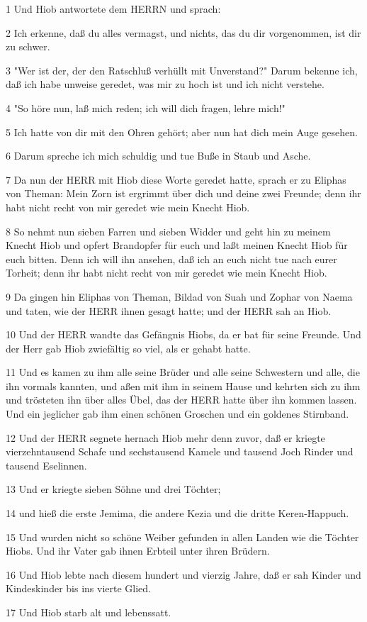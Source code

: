 \par 1 Und Hiob antwortete dem HERRN und sprach:
\par 2 Ich erkenne, daß du alles vermagst, und nichts, das du dir vorgenommen, ist dir zu schwer.
\par 3 "Wer ist der, der den Ratschluß verhüllt mit Unverstand?" Darum bekenne ich, daß ich habe unweise geredet, was mir zu hoch ist und ich nicht verstehe.
\par 4 "So höre nun, laß mich reden; ich will dich fragen, lehre mich!"
\par 5 Ich hatte von dir mit den Ohren gehört; aber nun hat dich mein Auge gesehen.
\par 6 Darum spreche ich mich schuldig und tue Buße in Staub und Asche.
\par 7 Da nun der HERR mit Hiob diese Worte geredet hatte, sprach er zu Eliphas von Theman: Mein Zorn ist ergrimmt über dich und deine zwei Freunde; denn ihr habt nicht recht von mir geredet wie mein Knecht Hiob.
\par 8 So nehmt nun sieben Farren und sieben Widder und geht hin zu meinem Knecht Hiob und opfert Brandopfer für euch und laßt meinen Knecht Hiob für euch bitten. Denn ich will ihn ansehen, daß ich an euch nicht tue nach eurer Torheit; denn ihr habt nicht recht von mir geredet wie mein Knecht Hiob.
\par 9 Da gingen hin Eliphas von Theman, Bildad von Suah und Zophar von Naema und taten, wie der HERR ihnen gesagt hatte; und der HERR sah an Hiob.
\par 10 Und der HERR wandte das Gefängnis Hiobs, da er bat für seine Freunde. Und der Herr gab Hiob zwiefältig so viel, als er gehabt hatte.
\par 11 Und es kamen zu ihm alle seine Brüder und alle seine Schwestern und alle, die ihn vormals kannten, und aßen mit ihm in seinem Hause und kehrten sich zu ihm und trösteten ihn über alles Übel, das der HERR hatte über ihn kommen lassen. Und ein jeglicher gab ihm einen schönen Groschen und ein goldenes Stirnband.
\par 12 Und der HERR segnete hernach Hiob mehr denn zuvor, daß er kriegte vierzehntausend Schafe und sechstausend Kamele und tausend Joch Rinder und tausend Eselinnen.
\par 13 Und er kriegte sieben Söhne und drei Töchter;
\par 14 und hieß die erste Jemima, die andere Kezia und die dritte Keren-Happuch.
\par 15 Und wurden nicht so schöne Weiber gefunden in allen Landen wie die Töchter Hiobs. Und ihr Vater gab ihnen Erbteil unter ihren Brüdern.
\par 16 Und Hiob lebte nach diesem hundert und vierzig Jahre, daß er sah Kinder und Kindeskinder bis ins vierte Glied.
\par 17 Und Hiob starb alt und lebenssatt.

